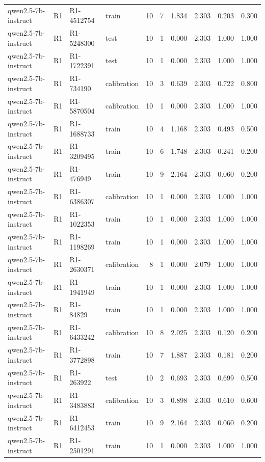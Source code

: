 \begin{table}
\begin{tabular}{llllrrrrrr}
qwen2.5-7b-instruct & R1 & R1-4512754 & train & 10 & 7 & 1.834 & 2.303 & 0.203 & 0.300 \\
qwen2.5-7b-instruct & R1 & R1-5248300 & test & 10 & 1 & 0.000 & 2.303 & 1.000 & 1.000 \\
qwen2.5-7b-instruct & R1 & R1-1722391 & test & 10 & 1 & 0.000 & 2.303 & 1.000 & 1.000 \\
qwen2.5-7b-instruct & R1 & R1-734190 & calibration & 10 & 3 & 0.639 & 2.303 & 0.722 & 0.800 \\
qwen2.5-7b-instruct & R1 & R1-5870504 & calibration & 10 & 1 & 0.000 & 2.303 & 1.000 & 1.000 \\
qwen2.5-7b-instruct & R1 & R1-1688733 & train & 10 & 4 & 1.168 & 2.303 & 0.493 & 0.500 \\
qwen2.5-7b-instruct & R1 & R1-3209495 & train & 10 & 6 & 1.748 & 2.303 & 0.241 & 0.200 \\
qwen2.5-7b-instruct & R1 & R1-476949 & train & 10 & 9 & 2.164 & 2.303 & 0.060 & 0.200 \\
qwen2.5-7b-instruct & R1 & R1-6386307 & calibration & 10 & 1 & 0.000 & 2.303 & 1.000 & 1.000 \\
qwen2.5-7b-instruct & R1 & R1-1022353 & train & 10 & 1 & 0.000 & 2.303 & 1.000 & 1.000 \\
qwen2.5-7b-instruct & R1 & R1-1198269 & train & 10 & 1 & 0.000 & 2.303 & 1.000 & 1.000 \\
qwen2.5-7b-instruct & R1 & R1-2630371 & calibration & 8 & 1 & 0.000 & 2.079 & 1.000 & 1.000 \\
qwen2.5-7b-instruct & R1 & R1-1941949 & train & 10 & 1 & 0.000 & 2.303 & 1.000 & 1.000 \\
qwen2.5-7b-instruct & R1 & R1-84829 & train & 10 & 1 & 0.000 & 2.303 & 1.000 & 1.000 \\
qwen2.5-7b-instruct & R1 & R1-6433242 & calibration & 10 & 8 & 2.025 & 2.303 & 0.120 & 0.200 \\
qwen2.5-7b-instruct & R1 & R1-3772898 & train & 10 & 7 & 1.887 & 2.303 & 0.181 & 0.200 \\
qwen2.5-7b-instruct & R1 & R1-263922 & test & 10 & 2 & 0.693 & 2.303 & 0.699 & 0.500 \\
qwen2.5-7b-instruct & R1 & R1-3483883 & calibration & 10 & 3 & 0.898 & 2.303 & 0.610 & 0.600 \\
qwen2.5-7b-instruct & R1 & R1-6412453 & train & 10 & 9 & 2.164 & 2.303 & 0.060 & 0.200 \\
qwen2.5-7b-instruct & R1 & R1-2501291 & train & 10 & 1 & 0.000 & 2.303 & 1.000 & 1.000 \\

\end{tabular}
\end{table}
